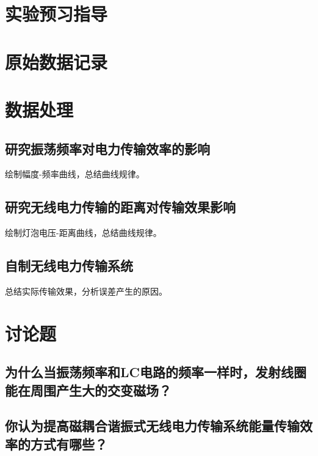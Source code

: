 \documentclass[signature=data]{physicsreport}
\begin{document}
\maketitle

\section{实验预习指导}
\newpage

\section{原始数据记录}
\makeatletter
{}
\makeatother

\newpage

\section{数据处理}
\subsection{研究振荡频率对电力传输效率的影响}
绘制幅度-频率曲线，总结曲线规律。
\vspace{11em}

\subsection{研究无线电力传输的距离对传输效果影响}
绘制灯泡电压-距离曲线，总结曲线规律。
\vspace{11em}

\subsection{自制无线电力传输系统}
总结实际传输效果，分析误差产生的原因。

\newpage

\section{讨论题}
\subsection{为什么当振荡频率和LC电路的频率一样时，发射线圈能在周围产生大的交变磁场？}
\vspace{10em}
\subsection{你认为提高磁耦合谐振式无线电力传输系统能量传输效率的方式有哪些？}
\end{document}
